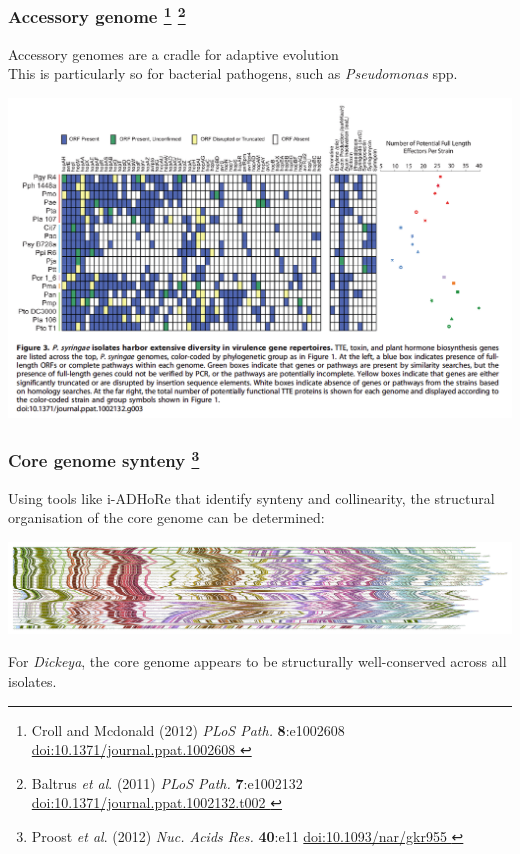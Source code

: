 \begin{frame}
  \frametitle{Accessory genome
   \footnote{\tiny{Croll and Mcdonald (2012) \textit{PLoS Path.} \textbf{8}:e1002608 \href{http://dx.doi.org/10.1371/journal.ppat.1002608}{doi:10.1371/journal.ppat.1002608
  }}}
    \footnote{\tiny{Baltrus \textit{et al}. (2011) \textit{PLoS Path.} \textbf{7}:e1002132 \href{http://dx.doi.org/10.1371/journal.ppat.1002132}{doi:10.1371/journal.ppat.1002132.t002
    }}}  
  }
  Accessory genomes are a cradle for adaptive evolution \\
  \textcolor{hutton_green}{This is particularly so for bacterial pathogens, such as \textit{Pseudomonas} spp.}
  \begin{center}
      \includegraphics[height=0.5\textheight]{images/pa_virulence} 
  \end{center}
\end{frame}

\begin{frame}
  \frametitle{Core genome synteny
    \footnote{\tiny{Proost \textit{et al}. (2012) \textit{Nuc. Acids Res.} \textbf{40}:e11 \href{http://dx.doi.org/10.1093/nar/gkr955}{doi:10.1093/nar/gkr955
    }}}
  }
  Using tools like i-ADHoRe that identify synteny and collinearity, the structural organisation of the core genome can be determined:
  \begin{center}
      \includegraphics[width=1\textwidth]{images/dickeya_core_collinear_small} 
  \end{center}
  For \textit{Dickeya}, the core genome appears to be structurally well-conserved across all isolates.
\end{frame}

